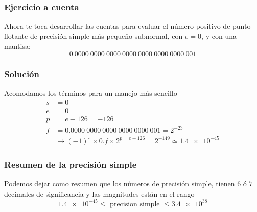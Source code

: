  \begin{frame}
 \frametitle{Ejercicio a cuenta}
 Ahora te toca desarrollar las cuentas para evaluar el número positivo de punto flotante de precisión simple más pequeño subnormal, con $e=0$, y con una mantisa:
 \[ 0 \: 0000 \: 0000 \: 0000 \: 0000 \: 0000 \: 0000 \: 0000 \: 001 \]
 \end{frame}
 \begin{frame}
 \frametitle{Solución}
 Acomodamos los términos para un manejo más sencillo
 \begin{align*}
s &= 0 \\
e &= 0 \\
p &= e - 126 = -126 \\
f &= 0.0000 \: 0000 \: 0000 \: 0000 \: 0000 \: 001 = 2^{-23} \\
&\rightarrow (-1)^{s} \times 0.f \times 2^{p=e-126} = 2^{-149} \simeq \num{1.4e-45}
\end{align*}
\end{frame}
\begin{frame}
\frametitle{Resumen de la precisión simple}
Podemos dejar como resumen que los números de precisión simple, tienen $6$ ó $7$ decimales de significancia y las magnitudes están en el rango
\[ \num{1.4e-45} \leq \text{ precision simple } \leq \num{3.4e38} \]
\end{frame}
